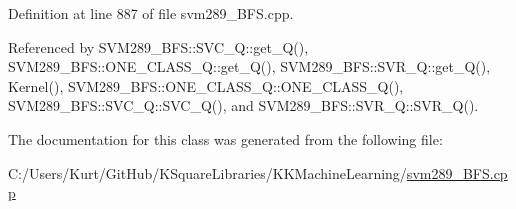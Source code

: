 Definition at line 887 of file svm289\+\_\+\+B\+F\+S.\+cpp.



Referenced by S\+V\+M289\+\_\+\+B\+F\+S\+::\+S\+V\+C\+\_\+\+Q\+::get\+\_\+\+Q(), S\+V\+M289\+\_\+\+B\+F\+S\+::\+O\+N\+E\+\_\+\+C\+L\+A\+S\+S\+\_\+\+Q\+::get\+\_\+\+Q(), S\+V\+M289\+\_\+\+B\+F\+S\+::\+S\+V\+R\+\_\+\+Q\+::get\+\_\+\+Q(), Kernel(), S\+V\+M289\+\_\+\+B\+F\+S\+::\+O\+N\+E\+\_\+\+C\+L\+A\+S\+S\+\_\+\+Q\+::\+O\+N\+E\+\_\+\+C\+L\+A\+S\+S\+\_\+\+Q(), S\+V\+M289\+\_\+\+B\+F\+S\+::\+S\+V\+C\+\_\+\+Q\+::\+S\+V\+C\+\_\+\+Q(), and S\+V\+M289\+\_\+\+B\+F\+S\+::\+S\+V\+R\+\_\+\+Q\+::\+S\+V\+R\+\_\+\+Q().



The documentation for this class was generated from the following file\+:\begin{DoxyCompactItemize}
\item 
C\+:/\+Users/\+Kurt/\+Git\+Hub/\+K\+Square\+Libraries/\+K\+K\+Machine\+Learning/\hyperlink{svm289___b_f_s_8cpp}{svm289\+\_\+\+B\+F\+S.\+cpp}\end{DoxyCompactItemize}
